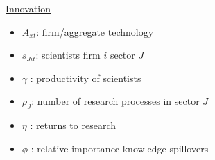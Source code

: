 \documentclass[11pt,aspectratio=169]{beamer}
\begin{document}
\begin{frame}{\hyperlink{modma}{Innovation}}
\begin{minipage}[t!]{0.43\textwidth}
	\begin{itemize}
		\item[] $A_{xt}$: firm/aggregate technology
		\vspace{-2mm}		
		\item[] $s_{Jit}$: scientists firm $i$ sector $J$
		\vspace{-2mm}
		\item[] $\gamma$ : productivity of scientists
	\end{itemize}
\end{minipage}
\vspace{-5mm}
\begin{minipage}[t!]{0.55\textwidth}
	\vspace{0mm}
	\begin{itemize}	
		\item[] {$\rho_J$: number of research processes in sector $J$}
		\vspace{-2mm}			
		\item[] $\eta$ : returns to research
		\vspace{-2mm}			
		\item[] $\phi$ : relative importance knowledge spillovers
	\end{itemize}
\end{minipage}
\end{frame}
\end{document}
